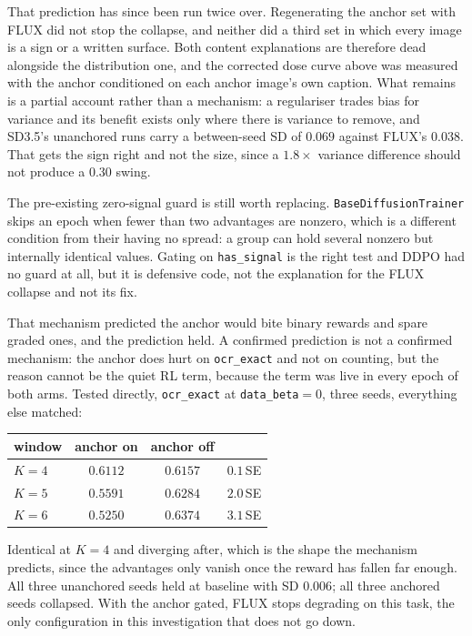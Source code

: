 \documentclass[11pt]{article}
\newcommand{\code}[1]{\texttt{\small #1}}
\begin{document}
That prediction has since been run twice over. Regenerating the anchor set with FLUX did not stop the collapse, and neither did a third set in which every image is a sign or a written surface. Both content explanations are therefore dead alongside the distribution one, and the corrected dose curve above was measured with the anchor conditioned on each anchor image's own caption. What remains is a partial account rather than a mechanism: a regulariser trades bias for variance and its benefit exists only where there is variance to remove, and SD3.5's unanchored runs carry a between-seed SD of $0.069$ against FLUX's $0.038$. That gets the sign right and not the size, since a $1.8\times$ variance difference should not produce a $0.30$ swing.

The pre-existing zero-signal guard is still worth replacing. \code{BaseDiffusionTrainer} skips an epoch when fewer than two advantages are nonzero, which is a different condition from their having no spread: a group can hold several nonzero but internally identical values. Gating on \code{has\_signal} is the right test and DDPO had no guard at all, but it is defensive code, not the explanation for the FLUX collapse and not its fix.

That mechanism predicted the anchor would bite binary rewards and spare graded ones, and the prediction held. A confirmed prediction is not a confirmed mechanism: the anchor does hurt on \code{ocr\_exact} and not on counting, but the reason cannot be the quiet RL term, because the term was live in every epoch of both arms. Tested directly, \code{ocr\_exact} at \code{data\_beta}$=0$, three seeds, everything else matched:

\begin{center}
\begin{tabular}{lccc}
\toprule
window & anchor on & anchor off & \\
\midrule
$K{=}4$ & $0.6112$ & $0.6157$ & $0.1$\,SE \\
$K{=}5$ & $0.5591$ & $0.6284$ & $2.0$\,SE \\
$K{=}6$ & $0.5250$ & $0.6374$ & $3.1$\,SE \\
\bottomrule
\end{tabular}
\end{center}

\noindent Identical at $K{=}4$ and diverging after, which is the shape the mechanism predicts, since the advantages only vanish once the reward has fallen far enough. All three unanchored seeds held at baseline with SD $0.006$; all three anchored seeds collapsed. With the anchor gated, FLUX stops degrading on this task, the only configuration in this investigation that does not go down.
\end{document}
